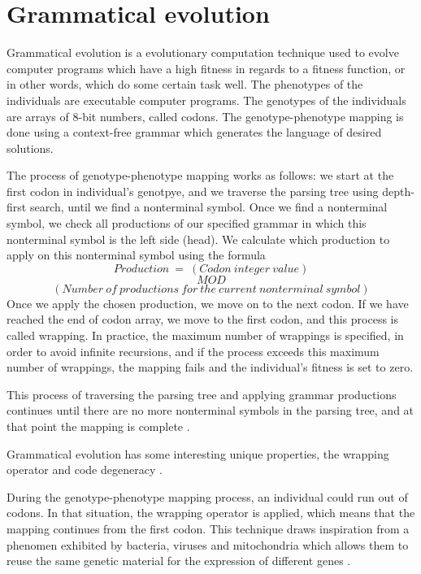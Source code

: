 \section{Grammatical evolution}
Grammatical evolution is a evolutionary computation technique used to evolve computer programs which have a high fitness in regards to a fitness function, or in other words, which do some certain task well. The phenotypes of the individuals are executable computer programs. The genotypes of the individuals are arrays of 8-bit numbers, called codons. The genotype-phenotype mapping is done using a context-free grammar which generates the language of desired solutions.

The process of genotype-phenotype mapping works as follows: we start at the first codon in individual's genotpye, and we traverse the parsing tree using depth-first search, until we find a nonterminal symbol. Once we find a nonterminal symbol, we check all productions of our specified grammar in which this nonterminal symbol is the left side (head). We calculate which production to apply on this nonterminal symbol using the formula 
$$Production\:=\:(Codon\:integer\:value)$$
$$MOD$$ 
$$(Number\:of\:productions\:for\:the\:current\:nonterminal\:symbol)$$ 
Once we apply the chosen production, we move on to the next codon. If we have reached the end of codon array, we move to the first codon, and this process is called wrapping. In practice, the maximum number of wrappings is specified, in order to avoid infinite recursions, and if the process exceeds this maximum number of wrappings, the mapping fails and the individual's fitness is set to zero.

This process of traversing the parsing tree and applying grammar productions continues until there are no more nonterminal symbols in the parsing tree, and at that point the mapping is complete \citep{neill2003grammaticalevolution}.

Grammatical evolution has some interesting unique properties, the wrapping operator and code degeneracy \citep{neill2003grammaticalevolution}. 

During the genotype-phenotype mapping process, an individual could run out of codons. In that situation, the wrapping operator is applied, which means that the mapping continues from the first codon. This technique draws inspiration from a phenomen exhibited by bacteria, viruses and mitochondria which allows them to reuse the same genetic material for the expression of different genes \citep{neill2003grammaticalevolution}.


